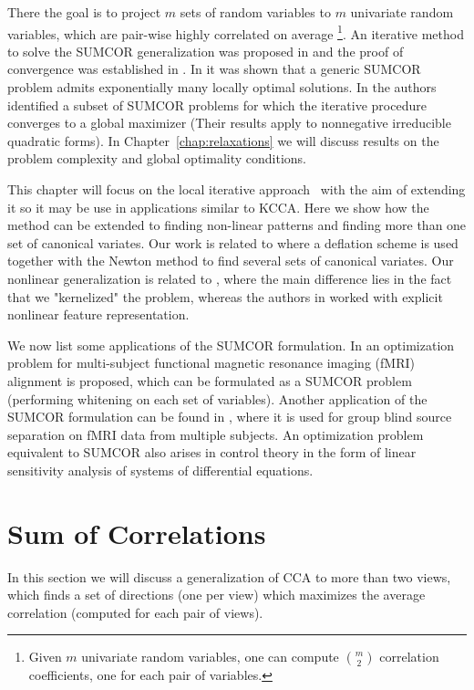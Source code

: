 There the goal is to project $m$ sets of random variables to $m$ univariate random variables, 
which are pair-wise highly correlated on average
\footnote{Given $m$ univariate random variables, one can compute $\binom{m}{2}$ correlation 
coefficients, one for each pair of variables.}. 
An iterative method to solve the SUMCOR generalization was proposed in \cite{Horst} 
and the proof of convergence was established in \cite{Chu}. In \cite{Chu} it was shown 
that a generic SUMCOR problem admits exponentially many locally optimal solutions. 
In \cite{GlobalMEP2} the authors identified a subset of SUMCOR problems for which the iterative 
procedure converges to a global maximizer (Their results apply to nonnegative irreducible quadratic forms).
In Chapter~\ref{chap:relaxations} we will discuss results on the problem complexity and global optimality
conditions.

This chapter will focus on the local iterative approach~\cite{Horst} with the aim of extending it
so it may be use in applications similar to KCCA.
Here we show how the method can be extended to finding non-linear patterns and finding more than one 
set of canonical variates. Our work is related to \cite{JointBSSAppl} where a deflation scheme 
is used together with the Newton method to find several sets of canonical variates. 
Our nonlinear generalization is related to \cite{nonlinJointBSS}, where the main difference 
lies in the fact that we "kernelized" the problem, whereas the authors in \cite{nonlinJointBSS} 
worked with explicit nonlinear feature representation.

We now list some applications of the SUMCOR formulation. In \cite{kernelHyperAppl} an optimization 
problem for multi-subject functional magnetic resonance imaging (fMRI) alignment is proposed, 
which can be formulated as a SUMCOR problem (performing whitening on each set of variables). 
Another application of the SUMCOR formulation can be found in \cite{JointBSSAppl}, 
where it is used for group blind source separation on fMRI data from multiple subjects. 
An optimization problem equivalent to SUMCOR also arises in control theory \cite{ControlApplication} 
in the form of linear sensitivity analysis of systems of differential equations.

\section{Sum of Correlations}\label{sec:sumcor}

In this section we will discuss a generalization of CCA to more than two views, which finds a set of directions (one per view) which
maximizes the average correlation (computed for each pair of views).

